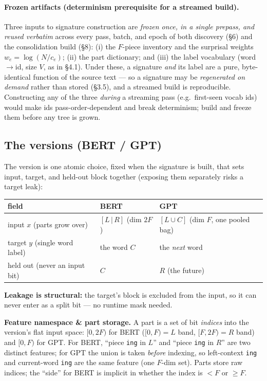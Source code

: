 \documentclass[11pt]{article}
\newcommand{\code}[1]{\texttt{#1}}
\begin{document}
\paragraph{Frozen artifacts (determinism prerequisite for a streamed build).}
Three inputs to signature construction are \emph{frozen once, in a single prepass, and reused verbatim} across every pass, batch, and epoch of both discovery (\S6) and the consolidation build (\S8): (i) the $F$-piece inventory and the surprisal weights $w_e=\log(N/c_e)$; (ii) the part dictionary; and (iii) the label vocabulary (word$\to$id, size $V$, as in \S4.1). Under these, a signature \emph{and} its label are a pure, byte-identical function of the source text --- so a signature may be \emph{regenerated on demand} rather than stored (\S3.5), and a streamed build is reproducible. Constructing any of the three \emph{during} a streaming pass (e.g.\ first-seen vocab ids) would make ids pass-order-dependent and break determinism; build and freeze them before any tree is grown.


\subsection{The versions (BERT / GPT)}
The version is one atomic choice, fixed when the signature is built, that sets input, target, and held-out block together (exposing them separately risks a target leak):

\begin{center}
\begin{tabular}{@{}lll@{}}
\toprule
field & \textbf{BERT} & \textbf{GPT}\\
\midrule
input $x$ (parts grow over) & $[L\,|\,R]$ (dim $2F$) & $[L\cup C]$ (dim $F$, one pooled bag)\\
target $y$ (single word label) & the word $C$ & the \emph{next} word\\
held out (never an input bit) & $C$ & $R$ (the future)\\
\bottomrule
\end{tabular}
\end{center}

\noindent\textbf{Leakage is structural:} the target's block is excluded from the input, so it can never enter as a split bit --- no runtime mask needed.

\noindent\textbf{Feature namespace \& part storage.} A part is a set of bit \emph{indices} into the version's flat input space: $[0,2F)$ for BERT ($[0,F)=L$ band, $[F,2F)=R$ band) and $[0,F)$ for GPT. For BERT, ``piece \code{ing} in $L$'' and ``piece \code{ing} in $R$'' are two distinct features; for GPT the union is taken \emph{before} indexing, so left-context \code{ing} and current-word \code{ing} are the same feature (one $F$-dim set). Parts store raw indices; the ``side'' for BERT is implicit in whether the index is $<F$ or $\ge F$.
\end{document}

